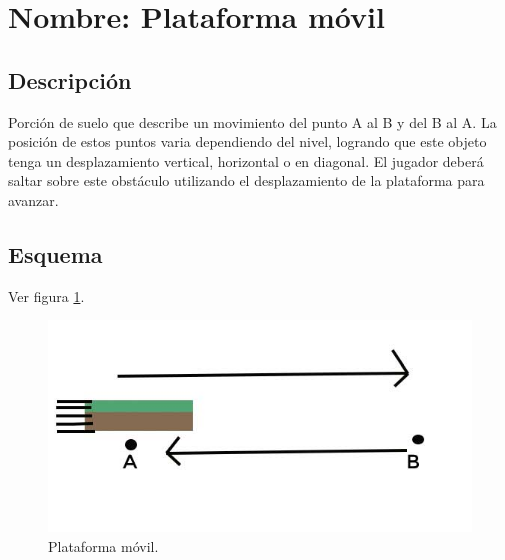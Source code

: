 \section{Nombre: Plataforma móvil}\label{obs.plataformaM}
	\subsection{Descripción}
Porción de suelo que describe un movimiento del punto A al B y del B al A. La posición de estos puntos varia dependiendo del nivel, logrando que este objeto tenga un desplazamiento vertical, horizontal o en diagonal. El jugador deberá saltar sobre este obstáculo utilizando el desplazamiento de la plataforma para avanzar.
	\subsection{Esquema}
Ver figura \ref{fig:PlatMovil}.
\begin{figure}
	\centering
	\includegraphics[height=0.3 \textheight]{Imagenes/plataformaMovil}
	\caption{Plataforma móvil.}
	\label{fig:PlatMovil}
\end{figure}